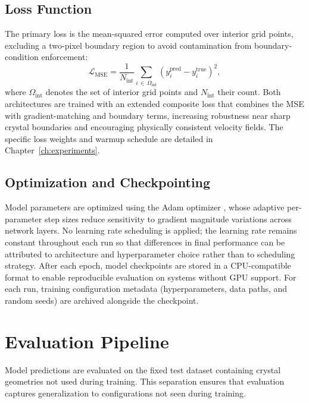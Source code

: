 \subsection{Loss Function}

The primary loss is the mean-squared error computed over interior grid points, excluding a two-pixel boundary region to avoid contamination from boundary-condition enforcement:
\[
\mathcal{L}_{\mathrm{MSE}}=
\frac{1}{N_{\mathrm{int}}}\sum_{i\,\in\,\Omega_{\mathrm{int}}}
\left(y^{\mathrm{pred}}_i-y^{\mathrm{true}}_i\right)^2,
\]
where $\Omega_{\mathrm{int}}$ denotes the set of interior grid points and $N_{\mathrm{int}}$ their count.
Both architectures are trained with an extended composite loss that combines the MSE with gradient-matching and boundary terms, increasing robustness near sharp crystal boundaries and encouraging physically consistent velocity fields. The specific loss weights and warmup schedule are detailed in Chapter~\ref{ch:experiments}.

\subsection{Optimization and Checkpointing}

Model parameters are optimized using the Adam optimizer \parencite{kingma2017adammethodstochasticoptimization}, whose adaptive per-parameter step sizes reduce sensitivity to gradient magnitude variations across network layers. No learning rate scheduling is applied; the learning rate remains constant throughout each run so that differences in final performance can be attributed to architecture and hyperparameter choice rather than to scheduling strategy. After each epoch, model checkpoints are stored in a CPU-compatible format to enable reproducible evaluation on systems without GPU support. For each run, training configuration metadata (hyperparameters, data paths, and random seeds) are archived alongside the checkpoint.

\section{Evaluation Pipeline}
\label{sec:evaluation}

Model predictions are evaluated on the fixed test dataset containing crystal geometries not used during training. This separation ensures that evaluation captures generalization to configurations not seen during training.

